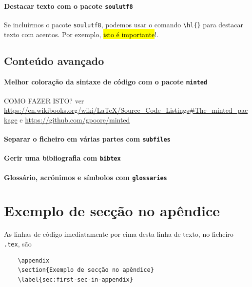 \documentclass[11pt]{article}
\begin{document}
\paragraph{Destacar texto com o pacote \texttt{soulutf8}}
Se incluírmos o pacote \texttt{soulutf8},
podemos usar o comando \verb|\hl{}| para destacar texto com acentos.
Por exemplo, \hl{isto é importante}!.

\subsection{Conteúdo avançado}

\paragraph{Melhor coloração da sintaxe de código com o pacote \texttt{minted}}
{\color{red} COMO FAZER ISTO?} ver
\url{https://en.wikibooks.org/wiki/LaTeX/Source_Code_Listings#The_minted_package} e
\url{https://github.com/gpoore/minted}

\paragraph{Separar o ficheiro em várias partes com \texttt{subfiles}}

\paragraph{Gerir uma bibliografia com \texttt{bibtex}}

\paragraph{Glossário, acrónimos e símbolos com \texttt{glossaries}}


\appendix

\section{Exemplo de secção no apêndice}
\label{sec:first-sec-in-appendix}

As linhas de código imediatamente por cima desta linha de texto, no ficheiro
\texttt{.tex}, são
\begin{verbatim}
    \appendix
    \section{Exemplo de secção no apêndice}
    \label{sec:first-sec-in-appendix}
\end{verbatim}
\end{document}
